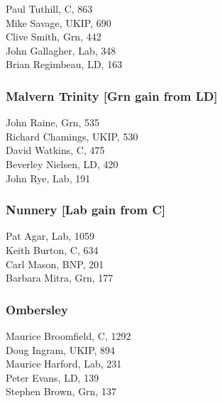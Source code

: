 \documentclass[a4paper,openany,10pt]{book}
\begin{document}
Paul Tuthill, C, 863\\
Mike Savage, UKIP, 690\\
Clive Smith, Grn, 442\\
John Gallagher, Lab, 348\\
Brian Regimbeau, LD, 163\\


\subsubsection*{Malvern Trinity \hspace*{\fill}\nolinebreak[1]%
\enspace\hspace*{\fill}
[Grn gain from LD]}



John Raine, Grn, 535\\
Richard Chamings, UKIP, 530\\
David Watkins, C, 475\\
Beverley Nielsen, LD, 420\\
John Rye, Lab, 191\\


\subsubsection*{Nunnery \hspace*{\fill}\nolinebreak[1]%
\enspace\hspace*{\fill}
[Lab gain from C]}



Pat Agar, Lab, 1059\\
Keith Burton, C, 634\\
Carl Mason, BNP, 201\\
Barbara Mitra, Grn, 177\\


\subsubsection*{Ombersley}



Maurice Broomfield, C, 1292\\
Doug Ingram, UKIP, 894\\
Maurice Harford, Lab, 231\\
Peter Evans, LD, 139\\
Stephen Brown, Grn, 137\\
\end{document}
